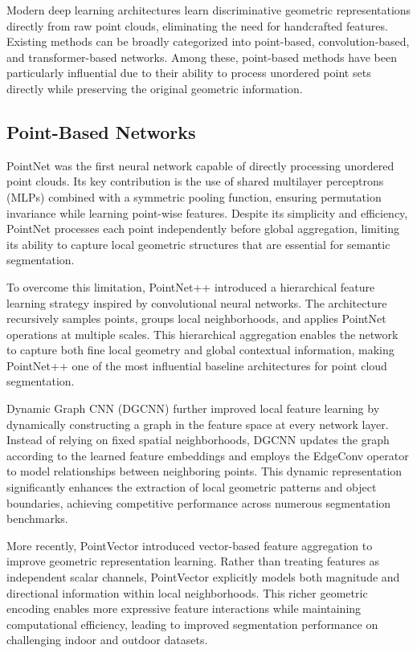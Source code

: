 Modern deep learning architectures learn discriminative geometric representations directly from raw point clouds, eliminating the need for handcrafted features. Existing methods can be broadly categorized into point-based, convolution-based, and transformer-based networks. Among these, point-based methods have been particularly influential due to their ability to process unordered point sets directly while preserving the original geometric information.

\subsection{Point-Based Networks}

PointNet \cite{Qi2017PointNet} was the first neural network capable of directly processing unordered point clouds. Its key contribution is the use of shared multilayer perceptrons (MLPs) combined with a symmetric pooling function, ensuring permutation invariance while learning point-wise features. Despite its simplicity and efficiency, PointNet processes each point independently before global aggregation, limiting its ability to capture local geometric structures that are essential for semantic segmentation.

To overcome this limitation, PointNet++ \cite{Qi2017PointNetPP} introduced a hierarchical feature learning strategy inspired by convolutional neural networks. The architecture recursively samples points, groups local neighborhoods, and applies PointNet operations at multiple scales. This hierarchical aggregation enables the network to capture both fine local geometry and global contextual information, making PointNet++ one of the most influential baseline architectures for point cloud segmentation.

Dynamic Graph CNN (DGCNN) \cite{Wang2019DGCNN} further improved local feature learning by dynamically constructing a graph in the feature space at every network layer. Instead of relying on fixed spatial neighborhoods, DGCNN updates the graph according to the learned feature embeddings and employs the EdgeConv operator to model relationships between neighboring points. This dynamic representation significantly enhances the extraction of local geometric patterns and object boundaries, achieving competitive performance across numerous segmentation benchmarks.

More recently, PointVector \cite{PointVector} introduced vector-based feature aggregation to improve geometric representation learning. Rather than treating features as independent scalar channels, PointVector explicitly models both magnitude and directional information within local neighborhoods. This richer geometric encoding enables more expressive feature interactions while maintaining computational efficiency, leading to improved segmentation performance on challenging indoor and outdoor datasets.

